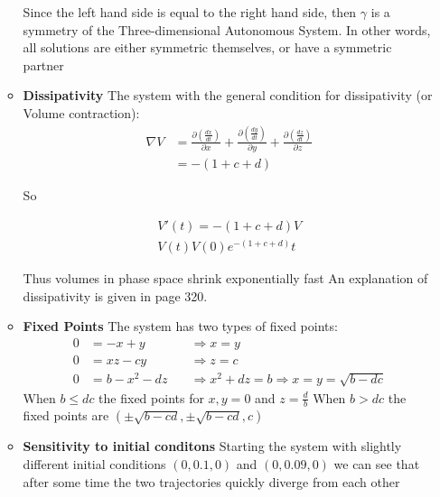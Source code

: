 \begin{itemize}
\begin{itemize}
 Since the left hand side is equal to the right hand side, then $\gamma$ is a symmetry of the Three-dimensional Autonomous System. In other words, all solutions are either symmetric themselves, or have a symmetric partner
\item \textbf{Dissipativity} The system with the general condition for dissipativity (or Volume contraction):\\
         \begin{align*}\nabla V &= \frac{\partial(\frac{dx}{dt})}{\partial x}+\frac{\partial(\frac{dy}{dt})}{\partial y}+\frac{\partial(\frac{dz}{dt})}{\partial z}\\
&=-(1+c+d)
 \end{align*}

 So

\begin{align*}
V'(t)=-(1+c+d)V\\
V(t)V(0)e^{-(1+c+d)}t
\end{align*}

Thus volumes in phase space shrink exponentially fast
An explanation of dissipativity is given in \cite{Strogatz14} page 320.

\item \textbf{Fixed Points} The system has two types of fixed points:\\

      \begin{align*}
      0&=-x+y   \quad &\Rightarrow x=y\\
      0&=xz-cy   \quad&\Rightarrow z=c\\
      0&=b-x^2-dz  \quad&\Rightarrow x^2+dz=b \Rightarrow x=y=\sqrt{b-dc}
      \end{align*}
When $b \leq dc$ the fixed points for $x,y=0$ and $z=\frac{d}{b}$
When $b > dc$ the fixed points are $(\pm\sqrt{b-cd},\pm\sqrt{b-cd},c)$

\item \textbf{Sensitivity to initial conditons} Starting the system with slightly different initial conditions $(0, 0.1, 0)$ and $(0, 0.09, 0)$ we can see that after some time the two trajectories quickly diverge from each other




\end{itemize}
\end{itemize}
